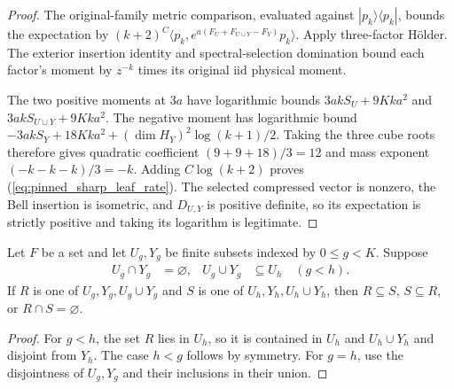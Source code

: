 \begin{proof}
    \leanok
    The original-family metric comparison, evaluated against
    $|p_k\rangle\langle p_k|$, bounds the expectation by
    $(k+2)^C\langle p_k,e^{a(F_U+F_{U\cup Y}-F_Y)}p_k\rangle$.
    Apply three-factor H\"older. The exterior insertion identity and
    spectral-selection domination bound each factor's moment by
    $z^{-k}$ times its original iid physical moment.

    The two positive moments at $3a$ have logarithmic bounds
    $3akS_U+9Kka^2$ and $3akS_{U\cup Y}+9Kka^2$.
    The negative moment has logarithmic bound
    $-3akS_Y+18Kka^2+(\dim H_Y)^2\log(k+1)/2$.
    Taking the three cube roots therefore gives quadratic coefficient
    $(9+9+18)/3=12$ and mass exponent $(-k-k-k)/3=-k$.
    Adding $C\log(k+2)$ proves (\ref{eq:pinned_sharp_leaf_rate}).
    The selected compressed vector is nonzero, the Bell insertion is
    isometric, and $D_{U,Y}$ is positive definite, so its expectation is
    strictly positive and taking its logarithm is legitimate.
\end{proof}

\begin{theorem}
\label{thm:replica_band_regions_subset_or_disjoint}
    \leanok
Let $F$ be a set and let $U_g,Y_g$ be finite subsets indexed by
$0\le g<K$. Suppose
\begin{align*}
 U_g\cap Y_g&=\varnothing, & U_g\cup Y_g&\subseteq U_h\quad(g<h).
\end{align*}
If $R$ is one of $U_g,Y_g,U_g\cup Y_g$ and $S$ is one of
$U_h,Y_h,U_h\cup Y_h$, then $R\subseteq S$, $S\subseteq R$, or
$R\cap S=\varnothing$.
\end{theorem}
\begin{proof}
    \leanok
For $g<h$, the set $R$ lies in $U_h$, so it is contained in $U_h$
and $U_h\cup Y_h$ and disjoint from $Y_h$. The case $h<g$ follows
by symmetry. For $g=h$, use the disjointness of $U_g,Y_g$ and their
inclusions in their union.
\end{proof}

